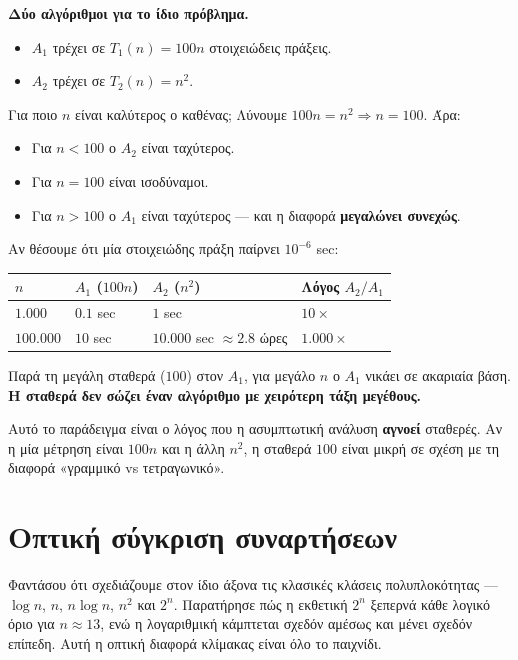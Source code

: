\documentclass[11pt,a4paper]{article}
\begin{document}
\begin{examplebox}
\textbf{Δύο αλγόριθμοι για το ίδιο πρόβλημα.}
\begin{itemize}
  \item $A_1$ τρέχει σε $T_1(n) = 100n$ στοιχειώδεις πράξεις.
  \item $A_2$ τρέχει σε $T_2(n) = n^2$.
\end{itemize}

Για ποιο $n$ είναι καλύτερος ο καθένας; Λύνουμε $100n = n^2 \Rightarrow n = 100$.
Άρα:
\begin{itemize}
  \item Για $n < 100$ ο $A_2$ είναι ταχύτερος.
  \item Για $n = 100$ είναι ισοδύναμοι.
  \item Για $n > 100$ ο $A_1$ είναι ταχύτερος --- και η διαφορά
  \textbf{μεγαλώνει συνεχώς}.
\end{itemize}

Αν θέσουμε ότι μία στοιχειώδης πράξη παίρνει $10^{-6}$ sec:

\begin{center}
\begin{tabular}{@{}l l l l@{}}
\toprule
$n$ & $A_1$ ($100n$) & $A_2$ ($n^2$) & Λόγος $A_2/A_1$ \\
\midrule
$1.000$   & $0.1$ sec & $1$ sec & $10\times$ \\
$100.000$ & $10$ sec  & $10.000$ sec $\approx 2.8$ ώρες & $1.000\times$ \\
\bottomrule
\end{tabular}
\end{center}

Παρά τη μεγάλη σταθερά ($100$) στον $A_1$, για μεγάλο $n$ ο $A_1$ νικάει σε
ακαριαία βάση. \textbf{Η σταθερά δεν σώζει έναν αλγόριθμο με χειρότερη τάξη
μεγέθους.}
\end{examplebox}

Αυτό το παράδειγμα είναι ο λόγος που η ασυμπτωτική ανάλυση \textbf{αγνοεί}
σταθερές. Αν η μία μέτρηση είναι $100n$ και η άλλη $n^2$, η σταθερά $100$ είναι
μικρή σε σχέση με τη διαφορά «γραμμικό vs τετραγωνικό».

\section{Οπτική σύγκριση συναρτήσεων}

Φαντάσου ότι σχεδιάζουμε στον ίδιο άξονα τις κλασικές κλάσεις πολυπλοκότητας ---
$\log n$, $n$, $n \log n$, $n^2$ και $2^n$. Παρατήρησε πώς η εκθετική $2^n$
ξεπερνά κάθε λογικό όριο για $n \approx 13$, ενώ η λογαριθμική κάμπτεται σχεδόν
αμέσως και μένει σχεδόν επίπεδη. Αυτή η οπτική διαφορά κλίμακας είναι όλο το
παιχνίδι.
\end{document}
